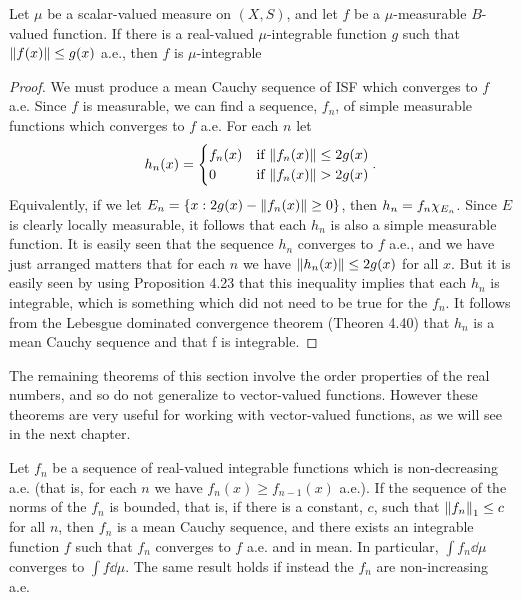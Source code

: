 \begin{theorem}
Let $\mu$ be a scalar-valued measure on $(X,S)$, and let $f$ be a $\mu$-measurable $B$-valued function. If there is a real-valued $\mu$-integrable function $g$ such that $\norm{f(x)}\leq g(x)$ a.e., then $f$ is $\mu$-integrable
\end{theorem}

\begin{proof}
We must produce a mean Cauchy sequence of ISF which converges to $f$ a.e. Since $f$ is measurable, we can find a sequence, $f_n$, of simple measurable functions which converges to $f$ a.e. For each $n$ let $$h_n(x)=\begin{cases}f_n(x)&\text{if }\norm{f_n(x)}\leq2g(x)\\0&\text{if }\norm{f_n(x)}>2g(x)\end{cases}.$$
Equivalently, if we let $E_n=\left\{x: 2g(x)-\norm{f_n(x)}\geq 0\right\}$, then $h_n=f_n\chi_{E_n}$. Since $E$ is clearly locally measurable, it follows that each $h_n$ is also a simple measurable function. It is easily seen that the sequence $h_n$ converges to $f$ a.e., and we have just arranged matters that for each $n$ we have $\norm{h_n(x)}\leq2g(x)$ for all $x$. But it is easily seen by using Proposition 4.23 that this inequality implies that each $h_n$ is integrable, which is something which did not need to be true for the $f_n$. It follows from the Lebesgue dominated convergence theorem (Theoren 4.40) that $h_n$ is a mean Cauchy sequence and that f is integrable.
\end{proof}

The remaining theorems of this section involve the order properties of the real numbers, and so do not generalize to vector-valued functions. However these theorems are very useful for working with vector-valued functions, as we will see in the next chapter.

\begin{theorem}
Let $f_n$ be a sequence of real-valued integrable functions which is non-decreasing a.e. (that is, for each $n$ we have $f_n(x)\geq f_{n-1}(x)$ a.e.). If the sequence of the norms of the $f_n$ is bounded, that is, if there is a constant, $c$, such that $\norm{f_n}_1\leq c$ for all $n$, then $f_n$ is a mean Cauchy sequence, and there exists an integrable function $f$ such that $f_n$ converges to $f$ a.e. and in mean. In particular, $\int f_n\dd\mu$ converges to $\int f\dd\mu$. The same result holds if instead the $f_n$ are non-increasing a.e.
\end{theorem}


